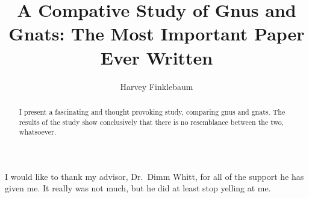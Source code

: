 \documentclass[12pt]{thesis}
\title{A Compative Study of Gnus and Gnats: The Most Important Paper Ever Written}
\author{Harvey Finklebaum}
\begin{document}
\maketitle

\makecopyright %


\preliminaries


\begin{abstract}
I present a fascinating and
thought provoking study, comparing gnus and gnats.
The results of the study show conclusively that there
is no resemblance between the two, whatsoever.
\end{abstract}

\begin{acknowledgments}
  I would like to thank my advisor, Dr.\ Dimm Whitt, for
  all of the support he has given me. It really was not much,
  but he did at least stop yelling at me.
\end{acknowledgments}

\tableofcontents

\listoftables

\listoffigures




\end{document}
